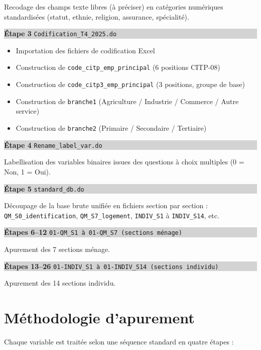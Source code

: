 \documentclass[11pt, a4paper]{article}
\newcommand{\etape}[2]{%
  \noindent\colorbox{lightgray}{\parbox{\dimexpr\linewidth-2\fboxsep}{%
    \textbf{#1} \hfill \texttt{\small #2}%
  }}%
  \vspace{2pt}%
}
\begin{document}
Recodage des champs texte libres (\og{}à préciser\fg{}) en catégories
numériques standardisées (statut, ethnie, religion, assurance, spécialité).

\vspace{0.2cm}
\etape{Étape 3}{Codification\_T4\_2025.do}

\begin{itemize}[topsep=2pt, itemsep=1pt]
  \item Importation des fichiers de codification Excel
  \item Construction de \texttt{code\_citp\_emp\_principal} (6 positions CITP-08)
  \item Construction de \texttt{code\_citp3\_emp\_principal} (3 positions, groupe de base)
  \item Construction de \texttt{branche1} (Agriculture / Industrie / Commerce / Autre service)
  \item Construction de \texttt{branche2} (Primaire / Secondaire / Tertiaire)
\end{itemize}

\vspace{0.2cm}
\etape{Étape 4}{Rename\_label\_var.do}

Labellisation des variables binaires issues des questions à choix multiples
(0 = Non, 1 = Oui).

\vspace{0.2cm}
\etape{Étape 5}{standard\_db.do}

Découpage de la base brute unifiée en fichiers section par section :
\texttt{QM\_S0\_identification}, \texttt{QM\_S7\_logement},
\texttt{INDIV\_S1} à \texttt{INDIV\_S14}, etc.

\vspace{0.2cm}
\etape{Étapes 6--12}{01-QM\_S1 à 01-QM\_S7 \quad(sections ménage)}

Apurement des 7 sections ménage.

\vspace{0.2cm}
\etape{Étapes 13--26}{01-INDIV\_S1 à 01-INDIV\_S14 \quad(sections individu)}

Apurement des 14 sections individu.

\section{Méthodologie d'apurement}

Chaque variable est traitée selon une séquence standard en quatre étapes :
\end{document}
